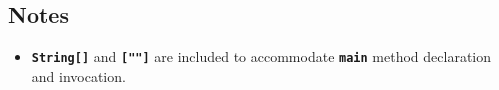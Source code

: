 \subsection*{Notes}

\begin{itemize}
\item \textbf{\texttt{String[]}} and \textbf{\texttt{[""]}} are included to accommodate \textbf{\texttt{main}} method declaration and invocation.
\end{itemize}
